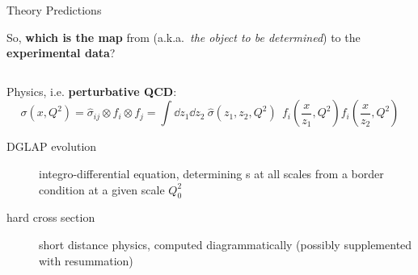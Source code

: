 \documentclass[9pt]{beamer}
\begin{document}
\begin{frame}{Theory Predictions}
    \vspace*{15pt}
    \begin{center}
        So, \alert{\textbf{which is the map}} from \textbf{\pdf} (a.k.a.\
        \textit{the object to be determined}) to the \textbf{experimental
        data}?
    \end{center}
    \vspace*{15pt}

    \begin{columns}
        \begin{column}{0.5\textwidth}
            Physics, i.e. \alert{\textbf{perturbative QCD}}:
            \begin{equation*}
                \sigma(x, Q^2) = \hat{\sigma}_{ij} \otimes f_i \otimes f_j =
                \int \dd z_1 \dd z_2 ~\hat{\sigma}(z_1, z_2, Q^2)~~
                f_i\left(\frac{x}{z_1}, Q^2\right) f_i\left(\frac{x}{z_2},
                Q^2\right)
            \end{equation*}

            \begin{description}
                \item[DGLAP evolution] integro-differential equation,
                    determining \pdf{}s at all scales from a border condition
                    at a given scale $Q_0^2$
                \item[hard cross section] short distance physics, computed
                    diagrammatically (possibly supplemented with resummation)
            \end{description}


\end{column}
\end{columns}
\end{frame}
\end{document}
